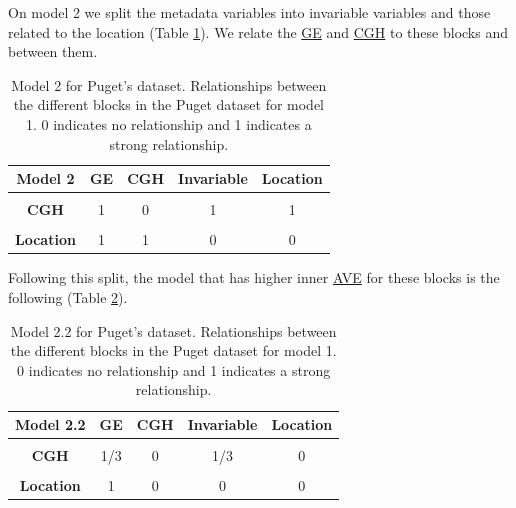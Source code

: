 \documentclass[
  12pt,
  a4paper,
  twoside,
  openright]{book}
\begin{document}
On model 2 we split the metadata variables into invariable variables and those related to the location (Table \ref{tab:puget-model2}).
We relate the \protect\hyperlink{acronyms_GE}{GE} and \protect\hyperlink{acronyms_CGH}{CGH} to these blocks and between them.

\begin{table}[H]

\caption[Model 2 for the Puget's dataset.]{\label{tab:puget-model2}Model 2 for Puget's dataset. Relationships between the different blocks in the Puget dataset for model 1. 0 indicates no relationship and 1 indicates a strong relationship.}
\centering
\begin{tabular}[t]{>{}c|c|c|c|c}
\hline
\textbf{Model 2} & \textbf{GE} & \textbf{CGH} & \textbf{Invariable} & \textbf{Location}\\
\hline
\textbf{\cellcolor{gray!6}{GE}} & \cellcolor{gray!6}{0} & \cellcolor{gray!6}{1} & \cellcolor{gray!6}{1} & \cellcolor{gray!6}{1}\\
\hline
\textbf{CGH} & 1 & 0 & 1 & 1\\
\hline
\textbf{\cellcolor{gray!6}{Invariable}} & \cellcolor{gray!6}{1} & \cellcolor{gray!6}{1} & \cellcolor{gray!6}{0} & \cellcolor{gray!6}{0}\\
\hline
\textbf{Location} & 1 & 1 & 0 & 0\\
\hline
\end{tabular}
\end{table}

Following this split, the model that has higher inner \protect\hyperlink{acronyms_AVE}{AVE} for these blocks is the following (Table \ref{tab:puget-model2-2}).

\begin{table}[H]

\caption[Model 2.2 the for Puget's dataset.]{\label{tab:puget-model2-2}Model 2.2 for Puget's dataset. Relationships between the different blocks in the Puget dataset for model 1. 0 indicates no relationship and 1 indicates a strong relationship.}
\centering
\begin{tabular}[t]{>{}c|c|c|c|c}
\hline
\textbf{Model 2.2} & \textbf{GE} & \textbf{CGH} & \textbf{Invariable} & \textbf{Location}\\
\hline
\textbf{\cellcolor{gray!6}{GE}} & \cellcolor{gray!6}{0} & \cellcolor{gray!6}{1/3} & \cellcolor{gray!6}{0} & \cellcolor{gray!6}{1}\\
\hline
\textbf{CGH} & 1/3 & 0 & 1/3 & 0\\
\hline
\textbf{\cellcolor{gray!6}{Invariable}} & \cellcolor{gray!6}{0} & \cellcolor{gray!6}{1/3} & \cellcolor{gray!6}{0} & \cellcolor{gray!6}{0}\\
\hline
\textbf{Location} & 1 & 0 & 0 & 0\\
\hline
\end{tabular}
\end{table}
\end{document}
